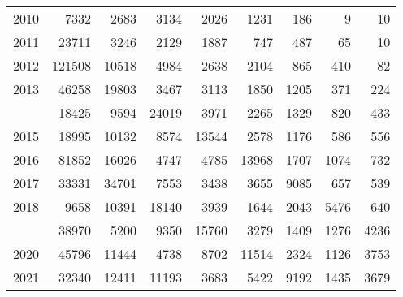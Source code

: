 \documentclass[
]{article}
\begin{document}
\begin{longtable}[t]{lrrrrrrrr}
2010 & 7332 & 2683 & 3134 & 2026 & 1231 & 186 & 9 & 10\\
2011 & 23711 & 3246 & 2129 & 1887 & 747 & 487 & 65 & 10\\
2012 & 121508 & 10518 & 4984 & 2638 & 2104 & 865 & 410 & 82\\
2013 & 46258 & 19803 & 3467 & 3113 & 1850 & 1205 & 371 & 224\\
\addlinespace
2014 & 18425 & 9594 & 24019 & 3971 & 2265 & 1329 & 820 & 433\\
2015 & 18995 & 10132 & 8574 & 13544 & 2578 & 1176 & 586 & 556\\
2016 & 81852 & 16026 & 4747 & 4785 & 13968 & 1707 & 1074 & 732\\
2017 & 33331 & 34701 & 7553 & 3438 & 3655 & 9085 & 657 & 539\\
2018 & 9658 & 10391 & 18140 & 3939 & 1644 & 2043 & 5476 & 640\\
\addlinespace
2019 & 38970 & 5200 & 9350 & 15760 & 3279 & 1409 & 1276 & 4236\\
2020 & 45796 & 11444 & 4738 & 8702 & 11514 & 2324 & 1126 & 3753\\
2021 & 32340 & 12411 & 11193 & 3683 & 5422 & 9192 & 1435 & 3679\\*
\end{longtable}
\end{document}
